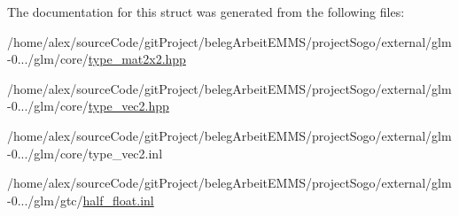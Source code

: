 The documentation for this struct was generated from the following files\-:\begin{DoxyCompactItemize}
\item 
/home/alex/source\-Code/git\-Project/beleg\-Arbeit\-E\-M\-M\-S/project\-Sogo/external/glm-\/0.../glm/core/\hyperlink{type__mat2x2_8hpp}{type\-\_\-mat2x2.\-hpp}\item 
/home/alex/source\-Code/git\-Project/beleg\-Arbeit\-E\-M\-M\-S/project\-Sogo/external/glm-\/0.../glm/core/\hyperlink{type__vec2_8hpp}{type\-\_\-vec2.\-hpp}\item 
/home/alex/source\-Code/git\-Project/beleg\-Arbeit\-E\-M\-M\-S/project\-Sogo/external/glm-\/0.../glm/core/type\-\_\-vec2.\-inl\item 
/home/alex/source\-Code/git\-Project/beleg\-Arbeit\-E\-M\-M\-S/project\-Sogo/external/glm-\/0.../glm/gtc/\hyperlink{half__float_8inl}{half\-\_\-float.\-inl}\end{DoxyCompactItemize}
